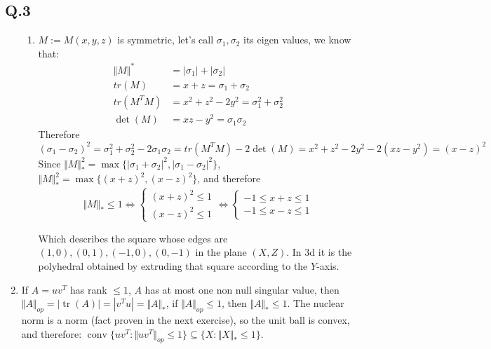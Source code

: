 \documentclass[12pt]{article}
\newcommand{\Q}[1]{\subsection*{Q.#1}}
\newenvironment{question}[1]
{\Q{#1}}{}
\DeclareMathOperator{\tr}{tr}
\DeclareMathOperator{\conv}{conv}
\begin{document}
\begin{question}{3}
\begin{enumerate}
\begin{enumerate}
    \item $M := M(x, y, z)$ is symmetric, let's call $\sigma_1, \sigma_2$ its eigen values, we know that:
      \begin{align*}
        \Vert M\Vert ^* &= |\sigma_1| + |\sigma_2| \\
        tr(M) &= x + z = \sigma_1 + \sigma_2 \\
        tr(M^TM) &= x^2 + z^2 - 2y^2 = \sigma_1^2 + \sigma_2^2\\
        \det(M) &= xz - y^2 = \sigma_1 \sigma_2
      \end{align*}
      Therefore $(\sigma_1 - \sigma_2)^2 = \sigma_1^2 + \sigma_2^2 - 2 \sigma_1\sigma_2 = tr(M^TM) - 2\det(M) = x^2 + z^2 - 2y^2 - 2(xz - y^2) = (x - z)^2$
      Since $\Vert M\Vert _*^2 = \max \{ |\sigma_1 + \sigma_2|^2, |\sigma_1 - \sigma_2|^2\}$, $\Vert M\Vert _*^2 = \max \{ (x+z)^2, (x-z)^2 \}$,
      and therefore \[ \Vert M\Vert _* \le 1 \iff \left\{ \begin{array}{c} (x+z)^2 \le 1\\ (x-z)^2 \le 1 \end{array} \right.  \iff \left\{ \begin{array}{c} -1 \le x+z \le 1\\ -1 \le x-z \le 1 \end{array} \right. \]

      Which describes the square whose edges are $(1, 0), (0, 1), (-1, 0), (0, -1)$ in the plane $(X, Z)$.
      In 3d it is the polyhedral obtained by extruding that square according to the $Y$-axis.
    \end{enumerate}

  \item If $A = uv^T$ has rank $\le 1$, $A$ has at most one non null singular value, then $\Vert A\Vert _{op} = |\tr(A)| = |v^Tu| = \Vert A\Vert _*$, if $\Vert A\Vert _{op} \le 1$, then $\Vert A\Vert _{*} \le 1$.
    The nuclear norm is a norm (fact proven in the next exercise), so the unit ball is convex, and therefore:
    $\conv \{ uv^T : \Vert uv^T\Vert _{op} \le 1 \} \subseteq \{ X : \Vert X\Vert _{*} \le  1\}$.


\end{enumerate}
\end{question}
\end{document}
